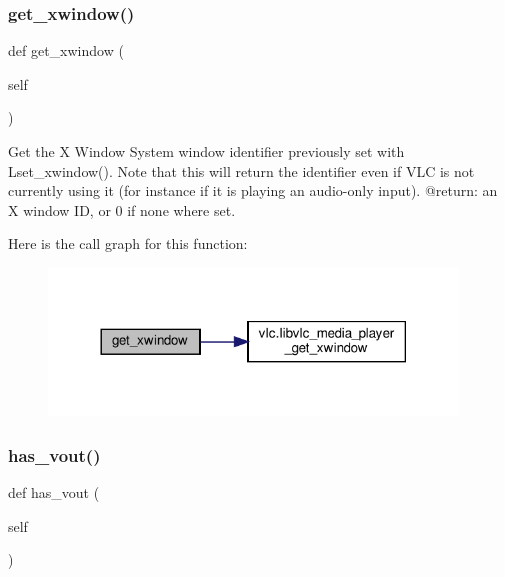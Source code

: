 \subsubsection{\texorpdfstring{get\+\_\+xwindow()}{get\_xwindow()}}
{\footnotesize\ttfamily def get\+\_\+xwindow (\begin{DoxyParamCaption}\item[{}]{self }\end{DoxyParamCaption})}

\begin{DoxyVerb}Get the X Window System window identifier previously set with
L{set_xwindow}(). Note that this will return the identifier
even if VLC is not currently using it (for instance if it is playing an
audio-only input).
@return: an X window ID, or 0 if none where set.
\end{DoxyVerb}
 Here is the call graph for this function\+:
\nopagebreak
\begin{figure}[H]
\begin{center}
\leavevmode
\includegraphics[width=308pt]{classvlc_1_1_media_player_a8ec246f66e5d2c300931d6748fa72cbf_cgraph}
\end{center}
\end{figure}
\mbox{\label{classvlc_1_1_media_player_a7a943244b82efa08b86d89339de2319c}} 
\subsubsection{\texorpdfstring{has\+\_\+vout()}{has\_vout()}}
{\footnotesize\ttfamily def has\+\_\+vout (\begin{DoxyParamCaption}\item[{}]{self }\end{DoxyParamCaption})}

